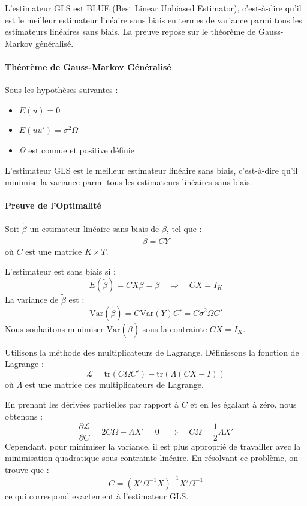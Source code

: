 \documentclass[14pt]{extarticle} %
\theoremstyle{definition}
\theoremstyle{plain}
\begin{document}
L'estimateur GLS est BLUE (Best Linear Unbiased Estimator), c'est-à-dire qu'il est le meilleur estimateur linéaire sans biais en termes de variance parmi tous les estimateurs linéaires sans biais. La preuve repose sur le théorème de Gauss-Markov généralisé.

\paragraph{Théorème de Gauss-Markov Généralisé}

Sous les hypothèses suivantes :
\begin{itemize}
    \item \( E(u) = 0 \)
    \item \( E(uu') = \sigma^2 \Omega \)
    \item \( \Omega \) est connue et positive définie
\end{itemize}
L'estimateur GLS est le meilleur estimateur linéaire sans biais, c'est-à-dire qu'il minimise la variance parmi tous les estimateurs linéaires sans biais.

\paragraph{Preuve de l'Optimalité}

Soit \(\tilde{\beta}\) un estimateur linéaire sans biais de \(\beta\), tel que :
\[
\tilde{\beta} = C Y
\]
où \( C \) est une matrice \( K \times T \).

L'estimateur est sans biais si :
\[
E(\tilde{\beta}) = C X \beta = \beta \quad \Rightarrow \quad C X = I_K
\]
La variance de \(\tilde{\beta}\) est :
\[
\text{Var}(\tilde{\beta}) = C \text{Var}(Y) C' = C \sigma^2 \Omega C'
\]
Nous souhaitons minimiser \(\text{Var}(\tilde{\beta})\) sous la contrainte \( C X = I_K \).

Utilisons la méthode des multiplicateurs de Lagrange. Définissons la fonction de Lagrange :
\[
\mathcal{L} = \text{tr}(C \Omega C') - \text{tr}(\Lambda (C X - I))
\]
où \( \Lambda \) est une matrice des multiplicateurs de Lagrange.

En prenant les dérivées partielles par rapport à \( C \) et en les égalant à zéro, nous obtenons :
\[
\frac{\partial \mathcal{L}}{\partial C} = 2 C \Omega - \Lambda X' = 0 \quad \Rightarrow \quad C \Omega = \frac{1}{2} \Lambda X'
\]
Cependant, pour minimiser la variance, il est plus approprié de travailler avec la minimisation quadratique sous contrainte linéaire. En résolvant ce problème, on trouve que :
\[
C = (X' \Omega^{-1} X)^{-1} X' \Omega^{-1}
\]
ce qui correspond exactement à l'estimateur GLS.
\end{document}
